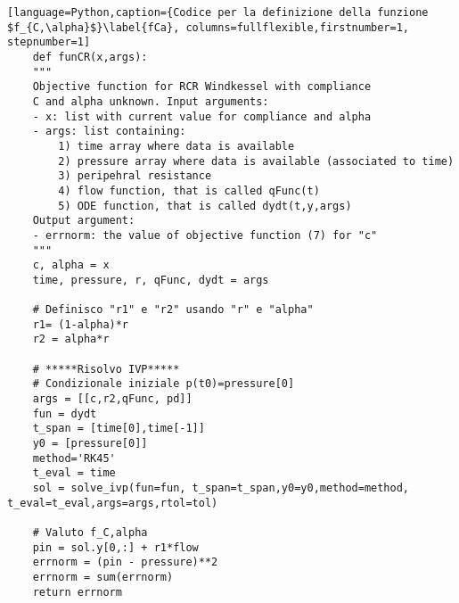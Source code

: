\begin{lstlisting}[language=Python,caption={Codice per la definizione della funzione  $f_{C,\alpha}$}\label{fCa}, columns=fullflexible,firstnumber=1, stepnumber=1]
    def funCR(x,args):
    """
    Objective function for RCR Windkessel with compliance
    C and alpha unknown. Input arguments:
    - x: list with current value for compliance and alpha
    - args: list containing:
        1) time array where data is available
        2) pressure array where data is available (associated to time)
        3) peripehral resistance
        4) flow function, that is called qFunc(t)
        5) ODE function, that is called dydt(t,y,args)
    Output argument:
    - errnorm: the value of objective function (7) for "c"
    """
    c, alpha = x
    time, pressure, r, qFunc, dydt = args
    
    # Definisco "r1" e "r2" usando "r" e "alpha"
    r1= (1-alpha)*r
    r2 = alpha*r
    
    # *****Risolvo IVP*****
    # Condizionale iniziale p(t0)=pressure[0]
    args = [[c,r2,qFunc, pd]]
    fun = dydt
    t_span = [time[0],time[-1]]
    y0 = [pressure[0]]
    method='RK45'
    t_eval = time
    sol = solve_ivp(fun=fun, t_span=t_span,y0=y0,method=method, t_eval=t_eval,args=args,rtol=tol)
    
    # Valuto f_C,alpha
    pin = sol.y[0,:] + r1*flow
    errnorm = (pin - pressure)**2
    errnorm = sum(errnorm)
    return errnorm
\end{lstlisting}